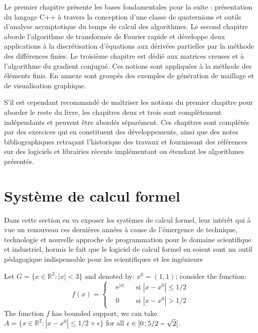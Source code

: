 \documentclass[11pt,fleqn]{book} %
\begin{document}
Le premier chapitre présente les bases fondamentales pour la suite : présentation du langage C++ à travers la conception d'une classe de quaternions et outils d'analyse asymptotique du temps de calcul des algorithmes. Le second chapitre aborde l'algorithme de transformée de Fourier rapide et développe deux applications à la discrétisation d'équations aux dérivées partielles par la méthode des différences finies. Le troisième chapitre est dédié aux matrices creuses et à l'algorithme du gradient conjugué. Ces notions sont appliquées à la méthode des éléments finis. En annexe sont groupés des exemples de génération de maillage et de visualisation graphique. 

S'il est cependant recommandé de maîtriser les notions du premier chapitre pour aborder le reste du livre, les chapitres deux et trois sont complètement indépendants et peuvent être abordés séparément. Ces chapitres sont complétés par des exercices qui en constituent des développements, ainsi que des notes bibliographiques retraçant l'historique des travaux et fournissant des références sur des logiciels et librairies récents implémentant ou étendant les algorithmes présentés. 

\section{Système de calcul formel}
Dans cette section en va exposer les systèmes de calcul formel, leur 
intérêt qui à vue un renouveau ces dernières années à cause de 
l'émergence de technique, technologie et nouvelle approche de 
programmation pour le domaine scientifique et industriel, hormis le fait 
que le logiciel de calcul formel en soient sont un outil pédagogique 
indispensable pour les scientifiques et les ingénieurs

\begin{example}
Let $G=\{x\in\mathbb{R}^2:|x|<3\}$ and denoted by: $x^0=(1,1)$; consider the function:
\begin{equation}
f(x)=\left\{\begin{aligned} & \mathrm{e}^{|x|} & & \text{si $|x-x^0|\leq 1/2$}\\
& 0 & & \text{si $|x-x^0|> 1/2$}\end{aligned}\right.
\end{equation}
The function $f$ has bounded support, we can take $A=\{x\in\mathbb{R}^2:|x-x^0|\leq 1/2+\epsilon\}$ for all $\epsilon\in\mathopen{]}0\,;5/2-\sqrt{2}\mathclose{[}$.
\end{example}
\end{document}
